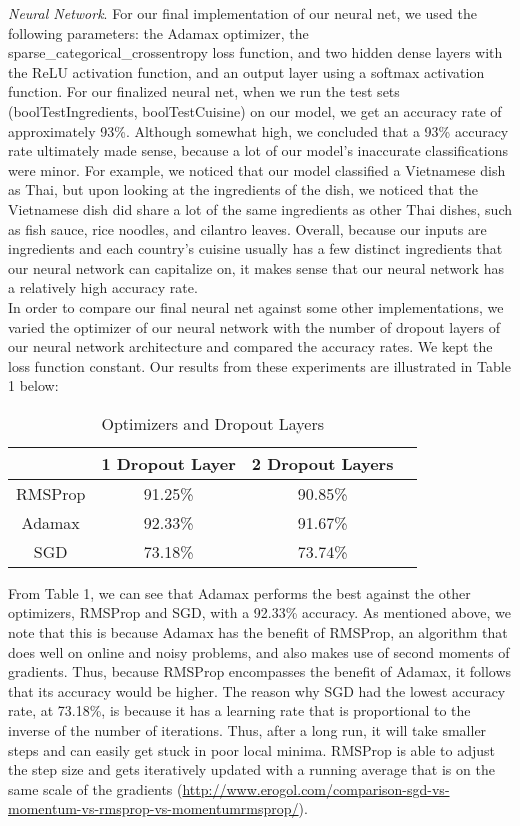\documentclass[11pt]{article}
\begin{document}
\textit{Neural Network}. For our final implementation of our neural net, we used the following parameters:
the Adamax optimizer, the sparse\_categorical\_crossentropy loss function, and
two hidden dense layers with the ReLU activation function, and an output layer
using a softmax activation function. For our finalized neural net,
when we run the test sets (boolTestIngredients, boolTestCuisine)
on our model, we get an accuracy rate of approximately 93\%. Although somewhat high, we
concluded that a 93\% accuracy rate ultimately made sense, because a lot of our
model's inaccurate classifications were minor. For example, we noticed that
our model classified a Vietnamese dish as Thai, but upon looking at the ingredients
of the dish, we noticed that the Vietnamese dish did share a lot of the same
ingredients as other Thai dishes, such as fish sauce, rice noodles, and cilantro
leaves. Overall, because our inputs are ingredients and each country's cuisine usually
has a few distinct ingredients that our neural network can capitalize on,
it makes sense that our neural network has a relatively high accuracy rate. \\

In order to compare our final neural net against some other implementations, we
varied the optimizer of our neural network with the number of dropout layers
of our neural network architecture and compared the accuracy rates. We kept the
loss function constant. Our results
from these experiments are illustrated in Table 1 below:

\begin{table}[h!]
\centering
\begin{tabular}{ |c|c|c|c| }
 \hline
    & 1 Dropout Layer & 2 Dropout Layers \\
 \hline
 RMSProp & 91.25\% &  90.85\% \\
 \hline
 Adamax & 92.33\% & 91.67\% \\
 \hline
 SGD & 73.18\% & 73.74\%  \\
 \hline
\end{tabular}

\caption{Optimizers and Dropout Layers}
\end{table}

From Table 1, we can see
that Adamax performs the best against the other optimizers, RMSProp and SGD,
with a 92.33\% accuracy. As mentioned above, we note that this is because
Adamax has the benefit of RMSProp, an algorithm that does well on online and
noisy problems, and also makes use of second moments of gradients. Thus, because
RMSProp encompasses the benefit of Adamax, it follows that its accuracy would
be higher. The reason why SGD had the lowest accuracy rate, at 73.18\%, is
because it has a learning rate that is proportional to the inverse of the
number of iterations. Thus, after a long run, it will take smaller steps and
can easily get stuck in poor local minima. RMSProp is able to adjust the step
size and gets iteratively updated with a running average that is on the
same scale of the gradients (\url{http://www.erogol.com/comparison-sgd-vs-momentum-vs-rmsprop-vs-momentumrmsprop/}). \\
\end{document}
